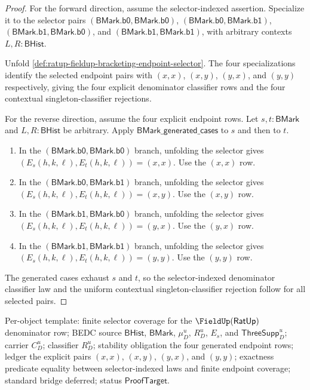 \begin{proof}
For the forward direction, assume the selector-indexed assertion. Specialize it
to the selector pairs $(\mathsf{BMark.b0},\mathsf{BMark.b0})$,
$(\mathsf{BMark.b0},\mathsf{BMark.b1})$,
$(\mathsf{BMark.b1},\mathsf{BMark.b0})$, and
$(\mathsf{BMark.b1},\mathsf{BMark.b1})$, with arbitrary contexts
$L,R:\mathsf{BHist}$.

Unfold \autoref{def:ratup-fieldup-bracketing-endpoint-selector}. The four
specializations identify the selected endpoint pairs with $(x,x)$, $(x,y)$,
$(y,x)$, and $(y,y)$ respectively, giving the four explicit denominator
classifier rows and the four contextual singleton-classifier rejections.

For the reverse direction, assume the four explicit endpoint rows. Let
$s,t:\mathsf{BMark}$ and $L,R:\mathsf{BHist}$ be arbitrary. Apply
$\mathsf{BMark\_generated\_cases}$ to $s$ and then to $t$.

\begin{enumerate}
  \item In the $(\mathsf{BMark.b0},\mathsf{BMark.b0})$ branch, unfolding the
  selector gives $(E_s(h,k,\ell),E_t(h,k,\ell))=(x,x)$. Use the $(x,x)$ row.

  \item In the $(\mathsf{BMark.b0},\mathsf{BMark.b1})$ branch, unfolding the
  selector gives $(E_s(h,k,\ell),E_t(h,k,\ell))=(x,y)$. Use the $(x,y)$ row.

  \item In the $(\mathsf{BMark.b1},\mathsf{BMark.b0})$ branch, unfolding the
  selector gives $(E_s(h,k,\ell),E_t(h,k,\ell))=(y,x)$. Use the $(y,x)$ row.

  \item In the $(\mathsf{BMark.b1},\mathsf{BMark.b1})$ branch, unfolding the
  selector gives $(E_s(h,k,\ell),E_t(h,k,\ell))=(y,y)$. Use the $(y,y)$ row.
\end{enumerate}

The generated cases exhaust $s$ and $t$, so the selector-indexed denominator
classifier law and the uniform contextual singleton-classifier rejection follow
for all selected pairs.
\end{proof}

Per-object template: finite selector coverage for the
$\FieldUp(\mathsf{RatUp})$ denominator row; BEDC source $\mathsf{BHist}$,
$\mathsf{BMark}$, $\mu_D^u$, $R_D^u$, $E_s$, and
$\mathsf{ThreeSupp}_D^u$; carrier $C_D^u$; classifier $R_D^u$; stability
obligation the four generated endpoint rows; ledger the explicit pairs
$(x,x)$, $(x,y)$, $(y,x)$, and $(y,y)$; exactness predicate equality between
selector-indexed laws and finite endpoint coverage; standard bridge deferred;
status $\mathsf{ProofTarget}$.

